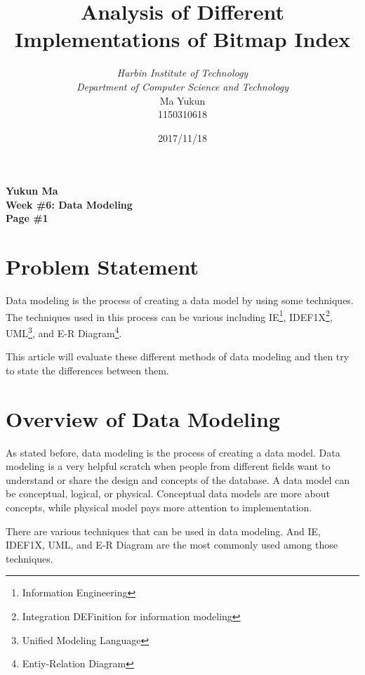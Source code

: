 \documentclass[12pt, a4paper]{article}
\begin{document}
\title{{\bf\Huge Analysis of Different Implementations of Bitmap Index}}
\author{\emph{Harbin Institute of Technology}\\\emph{Department of Computer Science and Technology}\\Ma Yukun\\1150310618}

\date{2017/11/18}

\nocite{*}


\begin{center}
{\textbf{
Yukun Ma\\
Week \#6: Data Modeling\\
Page \#1}}
\end{center}

\section{Problem Statement}

Data modeling is the process of creating a data model by using some techniques.\cite{wiki} The techniques used in this process can be various including IE\footnote{Information Engineering}, IDEF1X\footnote{Integration DEFinition for information modeling}, UML\footnote{Unified Modeling Language}, and E-R Diagram\footnote{Entiy-Relation Diagram}.

This article will evaluate these different methods of data modeling and then try to state the differences between them.




\section{Overview of Data Modeling}

As stated before, data modeling is the process of creating a data model. Data modeling is a very helpful scratch when people from different fields want to understand or share the design and concepts of the database. A data model can be conceptual, logical, or physical. Conceptual data models are more about concepts, while physical model pays more attention to implementation.

There are various techniques that can be used in data modeling. And IE, IDEF1X, UML, and E-R Diagram are the most commonly used among those techniques.
\end{document}
